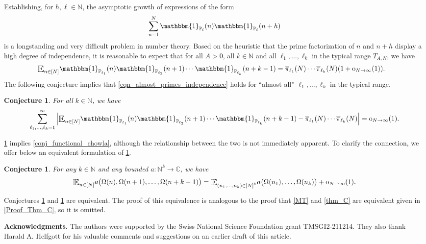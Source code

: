 \documentclass[letter,11pt]{article}
\theoremstyle{plain} %
\newtheorem{conjecture}[theorem]{Conjecture}
\theoremstyle{definition} %
\theoremstyle{plain}
\theoremstyle{plain}
\theoremstyle{plain}
\numberwithin{equation}{section}
\newcommand{\oh}{{\mathrm o}}
\newcommand{\N}{\mathbb{N}}
\newcommand{\C}{\mathbb{C}}
\renewcommand{\P}{\mathbb{P}}
\newcommand{\Esub}[1]{\raisebox{-0.4ex}{\scalebox{1.4}[1.3]{$\mathbb{E}$}}\raisebox{-0.35ex}{\ensuremath{_{\scriptstyle #1}}}}
\newcommand{\1}{\mathbbm{1}}
\begin{document}
Establishing, for $h,\ell\in\N$, the asymptotic growth of expressions of the form
\[
\sum_{n=1}^N \1_{\P_\ell}(n)\1_{\P_\ell}(n+h)
\]
is a longstanding and very difficult problem in number theory.
Based on the heuristic that the prime factorization of $n$ and $n+h$ display a high degree of independence, it is reasonable to expect that for all $A>0$, all $k\in\N$ and all $\ell_1,\ldots,\ell_k$ in the typical range $T_{A,N}$, we have
\begin{align}
\label{eqn_almost_primes_independence}
\Esub{n\in[N]} \1_{\P_{\ell_1}}(n)\1_{\P_{\ell_2}}(n+1)\cdots \1_{\P_{\ell_k}}(n+k-1)
&= \overline{\pi}_{\ell_1}(N)\cdots \overline{\pi}_{\ell_k}(N)(1+\oh_{N\to\infty}(1)).
\end{align}
The following conjecture implies that \eqref{eqn_almost_primes_independence} holds for ``almost all'' $\ell_1,\ldots,\ell_k$ in the typical range.

\begin{conjecture}
\label{conj_independence_almost_primes}
For all $k\in\N$, we have
\begin{equation*}
\sum_{\ell_1,\ldots,\ell_k=1}^\infty \Big|\Esub{n\in[N]} \1_{\P_{\ell_1}}(n)\1_{\P_{\ell_2}}(n+1)\cdots \1_{\P_{\ell_k}}(n+k-1) - \overline{\pi}_{\ell_1}(N)\cdots\overline{\pi}_{\ell_k}(N)\Big|
= \oh_{N\to\infty}(1).
\end{equation*}
\end{conjecture}

\cref{conj_independence_almost_primes} implies \cref{conj_functional_chowla}, although the relationship between the two is not immediately apparent. To clarify the connection, we offer below an equivalent formulation of \cref{conj_independence_almost_primes}.

\begin{conjecture}
\label{conj_functional_chowla_str}
For any $k\in\N$ and any bounded $a\colon\N^k\to\C$, we have
$$
\Esub{n\in[N]} a\big(\Omega(n),\Omega(n+1),\ldots,\Omega(n+k-1)\big)
= \Esub{(n_1,\ldots,n_k)\in[N]^k} a\big(\Omega(n_1),\ldots,\Omega(n_k)\big) + \oh_{N\to\infty}(1).
$$
\end{conjecture}

Conjectures \ref{conj_independence_almost_primes} and \ref{conj_functional_chowla_str} are equivalent. The proof of this equivalence is analogous to the proof that \cref{MT} and \cref{thm_C} are equivalent given in \cref{Proof_Thm_C}, so it is omitted.

\vspace{2mm} 
\noindent
\textbf{Acknowledgments.}
The authors were supported by the Swiss National
Science Foundation grant TMSGI2-211214.
They also thank Harald A. Helfgott for his valuable comments and suggestions on an earlier draft of this article.
\end{document}
